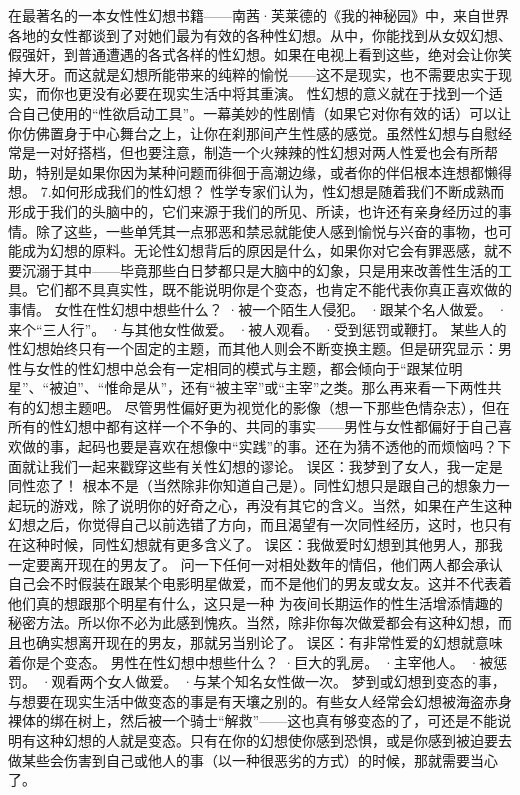 \documentclass[12pt,UTF8,openany]{ctexbook}
\begin{document}
在最著名的一本女性性幻想书籍——南茜·芙莱德的《我的神秘园》中，来自世界各地的女性都谈到了对她们最为有效的各种性幻想。从中，你能找到从女奴幻想、假强奸，到普通遭遇的各式各样的性幻想。如果在电视上看到这些，绝对会让你笑掉大牙。而这就是幻想所能带来的纯粹的愉悦——这不是现实，也不需要忠实于现实，而你也更没有必要在现实生活中将其重演。
性幻想的意义就在于找到一个适合自己使用的“性欲启动工具”。一幕美妙的性剧情（如果它对你有效的话）可以让你仿佛置身于中心舞台之上，让你在刹那间产生性感的感觉。虽然性幻想与自慰经常是一对好搭档，但也要注意，制造一个火辣辣的性幻想对两人性爱也会有所帮助，特别是如果你因为某种问题而徘徊于高潮边缘，或者你的伴侣根本连想都懒得想。
7.如何形成我们的性幻想？
性学专家们认为，性幻想是随着我们不断成熟而形成于我们的头脑中的，它们来源于我们的所见、所读，也许还有亲身经历过的事情。除了这些，一些单凭其一点邪恶和禁忌就能使人感到愉悦与兴奋的事物，也可能成为幻想的原料。无论性幻想背后的原因是什么，如果你对它会有罪恶感，就不要沉溺于其中——毕竟那些白日梦都只是大脑中的幻象，只是用来改善性生活的工具。它们都不具真实性，既不能说明你是个变态，也肯定不能代表你真正喜欢做的事情。
女性在性幻想中想些什么？
·被一个陌生人侵犯。
·跟某个名人做爱。
·来个“三人行”。
·与其他女性做爱。
·被人观看。
·受到惩罚或鞭打。
某些人的性幻想始终只有一个固定的主题，而其他人则会不断变换主题。但是研究显示：男性与女性的性幻想中总会有一定相同的模式与主题，都会倾向于“跟某位明星”、“被迫”、“惟命是从”，还有“被主宰”或“主宰”之类。那么再来看一下两性共有的幻想主题吧。
尽管男性偏好更为视觉化的影像（想一下那些色情杂志），但在所有的性幻想中都有这样一个不争的、共同的事实——男性与女性都偏好于自己喜欢做的事，起码也要是喜欢在想像中“实践”的事。还在为猜不透他的而烦恼吗？下面就让我们一起来戳穿这些有关性幻想的谬论。
误区：我梦到了女人，我一定是同性恋了！
根本不是（当然除非你知道自己是）。同性幻想只是跟自己的想象力一起玩的游戏，除了说明你的好奇之心，再没有其它的含义。当然，如果在产生这种幻想之后，你觉得自己以前选错了方向，而且渴望有一次同性经历，这时，也只有在这种时候，同性幻想就有更多含义了。
误区：我做爱时幻想到其他男人，那我一定要离开现在的男友了。
问一下任何一对相处数年的情侣，他们两人都会承认自己会不时假装在跟某个电影明星做爱，而不是他们的男友或女友。这并不代表着他们真的想跟那个明星有什么，这只是一种
为夜间长期运作的性生活增添情趣的秘密方法。所以你不必为此感到愧疚。当然，除非你每次做爱都会有这种幻想，而且也确实想离开现在的男友，那就另当别论了。
误区：有非常性爱的幻想就意味着你是个变态。
男性在性幻想中想些什么？
·巨大的乳房。
·主宰他人。
·被惩罚。
·观看两个女人做爱。
·与某个知名女性做一次。
梦到或幻想到变态的事，与想要在现实生活中做变态的事是有天壤之别的。有些女人经常会幻想被海盗赤身裸体的绑在树上，然后被一个骑士“解救”——这也真有够变态的了，可还是不能说明有这种幻想的人就是变态。只有在你的幻想使你感到恐惧，或是你感到被迫要去做某些会伤害到自己或他人的事（以一种很恶劣的方式）的时候，那就需要当心了。
\end{document}
